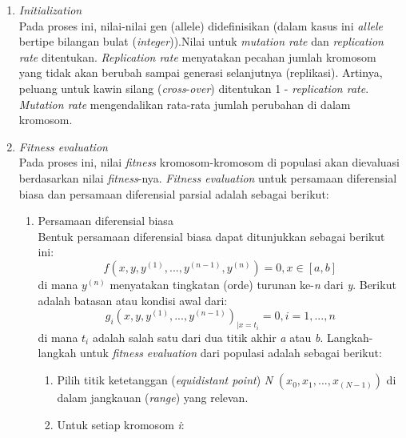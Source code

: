\begin{enumerate}[1.]

	\item \textit{Initialization}
	\\
	Pada proses ini, nilai-nilai gen (allele) didefinisikan (dalam kasus ini \textit{allele} bertipe bilangan bulat (\textit{integer})).Nilai untuk \textit{mutation rate} dan \textit{replication rate} ditentukan. \textit{Replication rate} menyatakan pecahan jumlah kromosom yang tidak akan berubah sampai generasi selanjutnya (replikasi). Artinya, peluang untuk kawin silang (\textit{cross}-\textit{over})  ditentukan 1 - \textit{replication rate}. \textit{Mutation rate} mengendalikan rata-rata jumlah perubahan di dalam kromosom. 

	\item \textit{Fitness evaluation}
	\\
	Pada proses ini, nilai \textit{fitness} kromosom-kromosom di populasi akan dievaluasi berdasarkan nilai \textit{fitness}-nya. \textit{Fitness evaluation} untuk persamaan diferensial biasa dan persamaan diferensial parsial adalah sebagai berikut:

	\begin{enumerate}[1.]

		\item Persamaan diferensial biasa
		\\
		Bentuk persamaan diferensial biasa dapat ditunjukkan sebagai berikut ini:
			\begin{equation} f(x, y, y ^{(1)}, ..., y^{(n-1)}, y^{(n)}) = 0, x \in [a, b] \end{equation}
		di mana \begin{math} y^{(n)} \end{math} menyatakan tingkatan (orde) turunan ke-\textit{n} dari \textit{y}. Berikut adalah batasan atau kondisi awal dari:
			\begin{equation} g_i {(x, y, y ^{(1)}, ..., y^{(n-1)})}_{| x = t_i} = 0, i = 1, ..., n \end{equation}
		di mana \begin{math}t_i\end{math} adalah salah satu dari dua titik akhir \textit{a} atau \textit{b}. Langkah-langkah untuk \textit{fitness evaluation} dari populasi adalah sebagai berikut:

		\begin{enumerate}[1.]

			\item Pilih titik ketetanggan (\textit{equidistant point}) \textit{N} \begin{math} (x_0, x_1, ..., x_{(N-1)}) \end{math} di dalam jangkauan (\textit{range}) yang relevan.
			\item Untuk setiap kromosom \textit{i}:


\end{enumerate}
\end{enumerate}
\end{enumerate}
